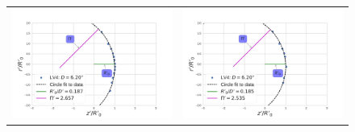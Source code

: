 \begin{figure}
\begin{tabular}{cc}
\includegraphics[clip]{./Programs/LV-bowshocks-xyfancy-positionswill-LV4} & \includegraphics[clip]{./Programs/Multi-Fit/samp00/LV-bowshocks-xyfancy-positionssamp00-LV4} \\

\end{tabular}
\end{figure}
